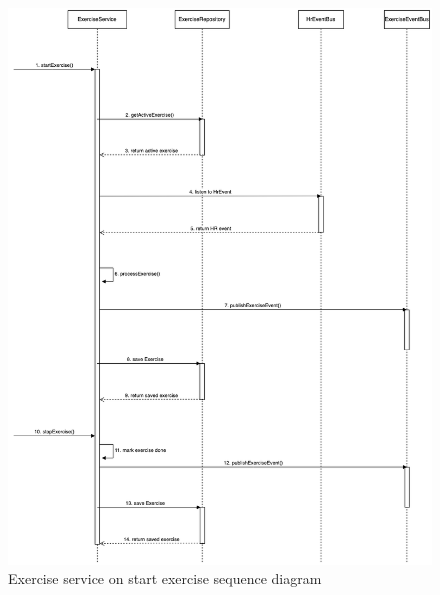 \begin{figure}[H]
    \centering
    \includegraphics[width=1\textwidth]{diagrams/exercise-service-start.drawio.png}
    \caption{Exercise service on start exercise sequence diagram}
    \label{fig:start_exercise_diagram}
\end{figure}


